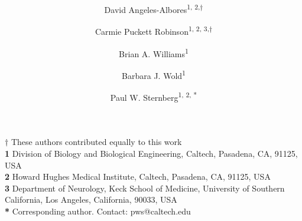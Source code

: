\documentclass[10pt, onecolumn]{article}
\title{
  \Large
  \textbf{\titleone}
}
\author{David Angeles-Albores\textsuperscript{1, 2,$\dagger{}$}
\and{}
Carmie Puckett Robinson\textsuperscript{1, 2, 3,$\dagger{}$}
\and{}
Brian A. Williams\textsuperscript{1}
\and{}
Barbara J. Wold\textsuperscript{1}
\and{}
Paul W. Sternberg\textsuperscript{1, 2, *}
}
\begin{document}
\linenumbers{}

\maketitle
\textbf{$\dagger$} These authors contributed equally to this work\\
\textbf{1} Division of Biology and Biological Engineering, Caltech,
Pasadena, CA, 91125, USA\\
\textbf{2} Howard Hughes Medical Institute, Caltech, Pasadena, CA, 91125, USA\\
\textbf{3} Department of Neurology, Keck School of Medicine, University of
Southern California, Los Angeles, California, 90033, USA\\
\textbf{*} Corresponding author. Contact: pws@caltech.edu
\end{document}
